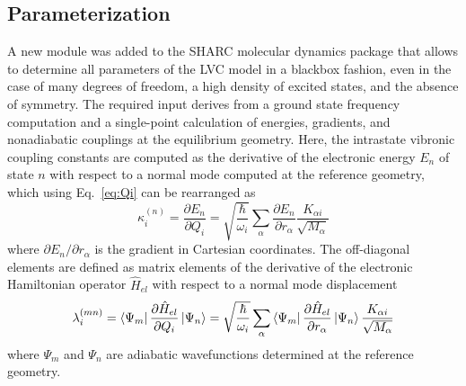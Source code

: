 \documentclass[twoside,twocolumn,9pt]{article}
\begin{document}
\subsection{Parameterization}
A new module was added to the SHARC molecular dynamics package\cite{Richter2011, Mai2015, Sharc} that allows to determine all parameters of the LVC model in a blackbox fashion, even in the case of many degrees of freedom, a high density of excited states, and the absence of symmetry.
The required input derives from a ground state frequency computation and a single-point calculation of energies, gradients, and nonadiabatic couplings at the equilibrium geometry.
Here, the intrastate vibronic coupling constants are computed as the derivative of the electronic energy $E_n$ of state $n$ with respect to a normal mode\cite{Koppel1984, Fumanal2016} computed at the reference geometry, which using Eq.~\eqref{eq:Qi} can be rearranged as
%
\begin{equation}
\label{eq:kappa}
\kappa_i^{(n)}=
\dfrac{\partial E_{n}}{\partial Q_i}
=
\sqrt{\frac{\hbar}{\omega_i}}\sum_{\alpha}\dfrac{\partial E_{n}}{\partial r_\alpha}\dfrac{K_{\alpha i}}{\sqrt{M_\alpha}}
\end{equation}
%
where $\partial E_{n}/\partial r_\alpha$ is the gradient in Cartesian coordinates.
The off-diagonal elements are defined as matrix elements of the derivative of the electronic Hamiltonian operator $\hat{H}_{el}$ with respect to a normal mode displacement\cite{Worth2004}
%
\begin{equation}
\label{eq:lambdaH}
\lambda_i^{(mn)}=
\bra{\Psi_m}\dfrac{\partial \hat{H}_{el}}{\partial Q_i}\ket{\Psi_n}=
\sqrt{\frac{\hbar}{\omega_i}}\sum_{\alpha}\bra{\Psi_m}\dfrac{\partial \hat{H}_{el}}{\partial r_\alpha}\ket{\Psi_n}\dfrac{K_{\alpha i}}{\sqrt{M_\alpha}}
\end{equation}
%
where $\Psi_m$ and $\Psi_n$ are adiabatic wavefunctions determined at the reference geometry.
\end{document}
